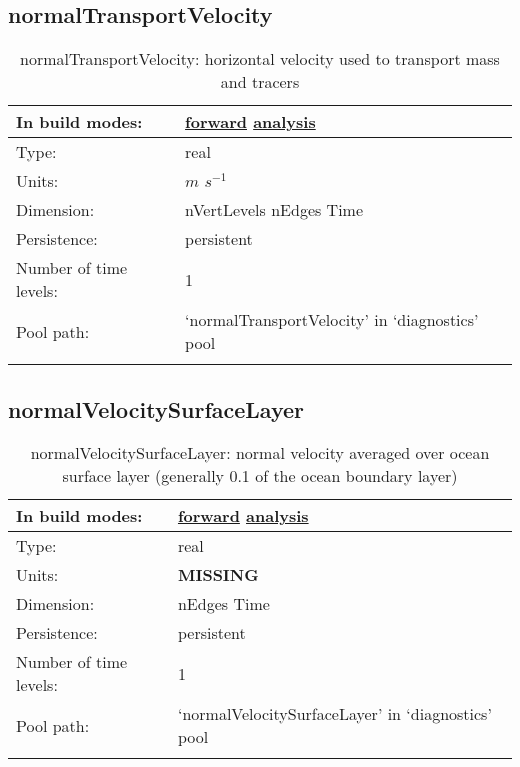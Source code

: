 \subsection[normalTransportVelocity]{normalTransportVelocity}
\label{subsec:var_sec_diagnostics_normalTransportVelocity}
\begin{center}
\begin{longtable}{| p{2.0in} | p{4.0in} |}
        \hline 
        In build modes: & \hyperref[subsec:forward_var_tab_diagnostics]{forward} \hyperref[subsec:analysis_var_tab_diagnostics]{analysis} \\
        \hline 
        Type: & real \\
        \hline 
        Units: & $m$ $s^{-1}$ \\
        \hline 
        Dimension: & nVertLevels nEdges Time \\
        \hline 
        Persistence: & persistent \\
        \hline 
        Number of time levels: & 1 \\
        \hline 
            Pool path: & `normalTransportVelocity' in `diagnostics' pool \\
		 \hline 
    \caption{normalTransportVelocity: horizontal velocity used to transport mass and tracers}
\end{longtable}
\end{center}
\subsection[normalVelocitySurfaceLayer]{normalVelocitySurfaceLayer}
\label{subsec:var_sec_diagnostics_normalVelocitySurfaceLayer}
\begin{center}
\begin{longtable}{| p{2.0in} | p{4.0in} |}
        \hline 
        In build modes: & \hyperref[subsec:forward_var_tab_diagnostics]{forward} \hyperref[subsec:analysis_var_tab_diagnostics]{analysis} \\
        \hline 
        Type: & real \\
        \hline 
        Units: & {\bf \color{red} MISSING} \\
        \hline 
        Dimension: & nEdges Time \\
        \hline 
        Persistence: & persistent \\
        \hline 
        Number of time levels: & 1 \\
        \hline 
            Pool path: & `normalVelocitySurfaceLayer' in `diagnostics' pool \\
		 \hline 
    \caption{normalVelocitySurfaceLayer: normal velocity averaged over ocean surface layer (generally 0.1 of the ocean boundary layer)}
\end{longtable}
\end{center}
